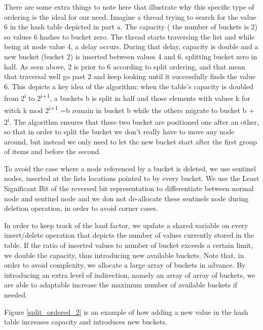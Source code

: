 There are some extra things to note here that illustrate why this specific type of ordering is the ideal for our need. Imagine a thread trying to search for the value 6 in the hash table depicted in part a. The capacity ( the number of buckets is 2) so values 6 hashes to bucket zero. The thread starts traversing the list and while being at node value 4, a delay occurs. During that delay, capacity is double and a new bucket (bucket 2) is inserted between values 4 and 6, splitting bucket zero in half. As seen above, 2 is prior to 6 according to split ordering, and that mean that traversal well go past 2 and keep looking until it successfully finds the value 6. This depicts a key idea of the algorithm: when the table's capacity is doubled from 2\textsuperscript{i} to 2\textsuperscript{i+1}, a buckets b is split in half and those elements with values k for witch k mod 2\textsuperscript{i+1} =b  remain in bucket b while the others migrate to bucket b + 2\textsuperscript{i}. The algorithm ensures that these two bucket are positioned one after an other, so that in order to split the bucket we don’t really have to move any node around, but instead we only need to let the new bucket start after the first group of items and before the second.

To avoid the case where a node referenced by a bucket is deleted, we use sentinel nodes, inserted at the lists locations pointed to by every bucket. We use the Least Significant Bit of the reversed bit representation to differentiate between normal node and sentinel node and we don not de-allocate these sentinels node during deletion operation, in order to avoid corner cases.

In order to keep track of the load factor, we update a shared variable on every insert/delete operation that depicts the number of values currently stored in the table. If the ratio of inserted values to number of bucket exceeds a certain limit, we double the capacity, thus introducing new available buckets. Note that, in order to avoid complexity, we allocate a large array of buckets in advance. By introducing an extra level of indirection, namely an array of array of buckets, we are able to adaptable increase the maximum number of available buckets if needed.

Figure \ref{split_ordered_2} is an example of how adding a new value in the hash table increases capacity and introduces new buckets.

